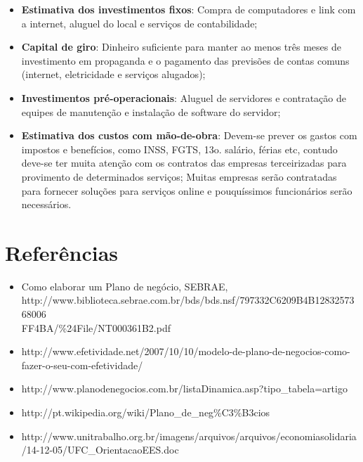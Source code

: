 \documentclass[12pt]{article}
\begin{document}
\begin{itemize}

	\item \textbf{Estimativa dos investimentos fixos}: Compra de computadores e link com a internet, aluguel do local e serviços de contabilidade;
	
	\item \textbf{Capital de giro}: Dinheiro suficiente para manter ao menos três meses de investimento em propaganda e o pagamento das previsões de contas comuns (internet, eletricidade e serviços alugados);
	
	\item \textbf{Investimentos pré-operacionais}: Aluguel de servidores e contratação de equipes de manutenção e instalação de software do servidor;
	
	\item \textbf{Estimativa dos custos com mão-de-obra}: Devem-se prever os gastos com impostos e benefícios, como INSS, FGTS, 13o. salário, férias etc, contudo deve-se ter muita atenção com os contratos das empresas terceirizadas para provimento de determinados serviços; Muitas empresas serão contratadas para fornecer soluções para serviços online e pouquíssimos funcionários serão necessários.
	
\end{itemize}

\section{Referências}
\begin{itemize}

	\item Como elaborar um Plano de negócio, SEBRAE, http://www.biblioteca.sebrae.com.br/bds/bds.nsf/797332C6209B4B1283257368006\\FF4BA/\%24File/NT000361B2.pdf

	\item http://www.efetividade.net/2007/10/10/modelo-de-plano-de-negocios-como-fazer-o-seu-com-efetividade/

	\item http://www.planodenegocios.com.br/listaDinamica.asp?tipo\_tabela=artigo

	\item http://pt.wikipedia.org/wiki/Plano\_de\_neg\%C3\%B3cios

	\item http://www.unitrabalho.org.br/imagens/arquivos/arquivos/economiasolidaria/14-12-05/UFC\_OrientacaoEES.doc


\end{itemize}
\end{document}
